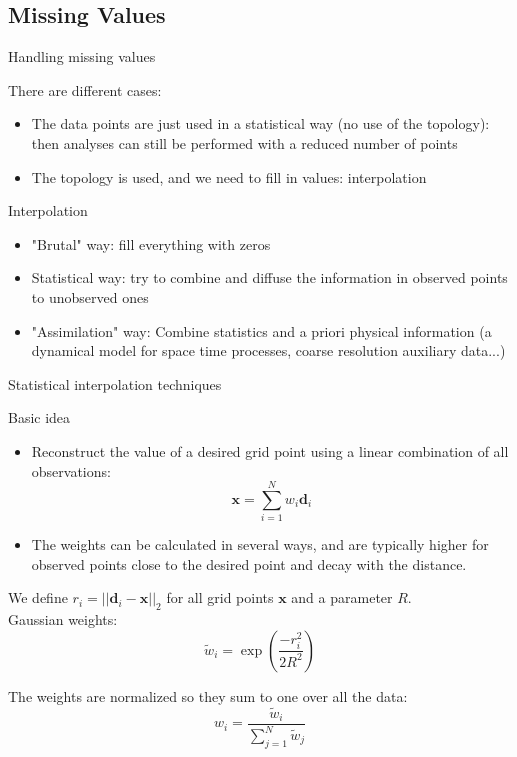 \documentclass{beamer}
\begin{document}
\subsection{Missing Values}
\begin{frame}{Handling missing values}

There are different cases:

\begin{itemize}
\item The data points are just used in a statistical way (no use of the topology): then analyses can still be performed with a reduced number of points
\item The topology is used, and we need to fill in values: interpolation
\end{itemize}

\begin{block}{Interpolation}
\begin{itemize}
\item "Brutal" way: fill everything with zeros
\item Statistical way: try to combine and diffuse the information in observed points to unobserved ones
\item "Assimilation" way: Combine statistics and a priori physical information (a dynamical model for space time processes, coarse resolution auxiliary data...)
\end{itemize}
\end{block}

\end{frame}

\begin{frame}{Statistical interpolation techniques}


\begin{block}{Basic idea}
\begin{itemize}
\item Reconstruct the value of a desired grid point using a linear combination of all observations:
\vspace{-0.2cm}
\begin{equation*}
\mathbf{x} = \sum_{i=1}^{N} w_{i} \mathbf{d}_{i}
\end{equation*}
\item The weights can be calculated in several ways, and are typically higher for observed points close to the desired point and decay with the distance.
\end{itemize}
\end{block}

We define $r_{i} = ||\mathbf{d}_{i} -\mathbf{x}||_{2}$ for all grid points $\mathbf{x}$ and a parameter $R$.\\

Gaussian weights:
\begin{equation*}
\tilde{w}_{i} = \exp \left(\frac{-r_{i}^2}{2R^2}\right)
\end{equation*}

The weights are normalized so they sum to one over all the data:
\begin{equation*}
w_{i} = \frac{\tilde{w}_{i}}{\sum_{j=1}^{N} \tilde{w}_{j}}
\end{equation*}

\end{frame}
\end{document}
